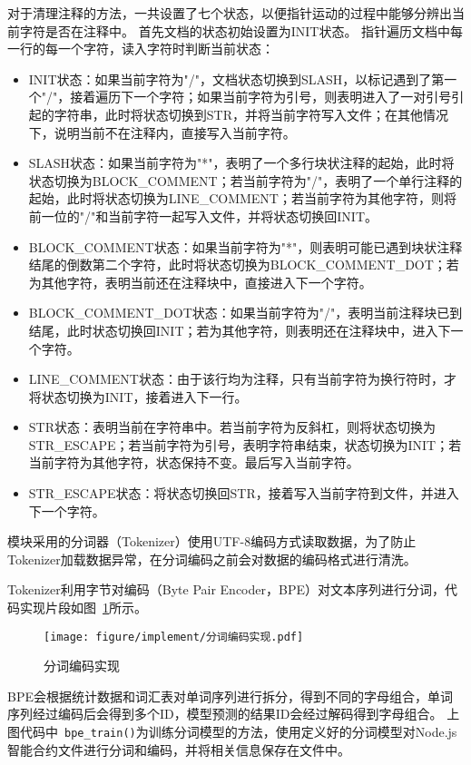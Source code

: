 对于清理注释的方法，一共设置了七个状态，以便指针运动的过程中能够分辨出当前字符是否在注释中。
首先文档的状态初始设置为INIT状态。
指针遍历文档中每一行的每一个字符，读入字符时判断当前状态：

\begin{itemize}
  \item INIT状态：如果当前字符为"/"，文档状态切换到SLASH，以标记遇到了第一个"/"，接着遍历下一个字符；如果当前字符为引号，则表明进入了一对引号引起的字符串，此时将状态切换到STR，并将当前字符写入文件；在其他情况下，说明当前不在注释内，直接写入当前字符。
  \item SLASH状态：如果当前字符为"*"，表明了一个多行块状注释的起始，此时将状态切换为BLOCK\_COMMENT；若当前字符为"/"，表明了一个单行注释的起始，此时将状态切换为LINE\_COMMENT；若当前字符为其他字符，则将前一位的"/"和当前字符一起写入文件，并将状态切换回INIT。
  \item BLOCK\_COMMENT状态：如果当前字符为"*"，则表明可能已遇到块状注释结尾的倒数第二个字符，此时将状态切换为BLOCK\_COMMENT\_DOT；若为其他字符，表明当前还在注释块中，直接进入下一个字符。
  \item BLOCK\_COMMENT\_DOT状态：如果当前字符为"/"，表明当前注释块已到结尾，此时状态切换回INIT；若为其他字符，则表明还在注释块中，进入下一个字符。
  \item LINE\_COMMENT状态：由于该行均为注释，只有当前字符为换行符时，才将状态切换为INIT，接着进入下一行。
  \item STR状态：表明当前在字符串中。若当前字符为反斜杠，则将状态切换为STR\_ESCAPE；若当前字符为引号，表明字符串结束，状态切换为INIT；若当前字符为其他字符，状态保持不变。最后写入当前字符。
  \item STR\_ESCAPE状态：将状态切换回STR，接着写入当前字符到文件，并进入下一个字符。
\end{itemize}

模块采用的分词器（Tokenizer）使用UTF-8编码方式读取数据，为了防止Tokenizer加载数据异常，在分词编码之前会对数据的编码格式进行清洗。

Tokenizer利用字节对编码（Byte Pair Encoder，BPE）对文本序列进行分词，代码实现片段如图~\ref{fig:5.7}所示。

\begin{figure}[htb]
  \centering
  \texttt{[image: figure/implement/分词编码实现.pdf]}
  \caption{分词编码实现}\label{fig:5.7}
\end{figure}

BPE会根据统计数据和词汇表对单词序列进行拆分，得到不同的字母组合，单词序列经过编码后会得到多个ID，模型预测的结果ID会经过解码得到字母组合。
上图代码中~\texttt{bpe\_train()}为训练分词模型的方法，使用定义好的分词模型对Node.js智能合约文件进行分词和编码，并将相关信息保存在文件中。


